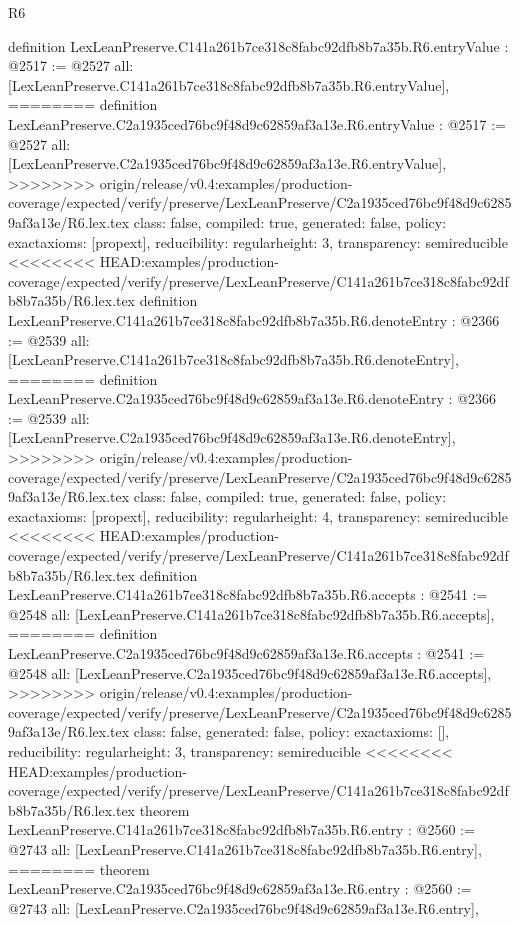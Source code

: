 \begin{lexlean}{R6}
\begin{coremodule}
{{{{{{{{{{{{{{definition LexLeanPreserve.C141a261b7ce318c8fabc92dfb8b7a35b.R6.entryValue : @2517 := @2527 {
  all: [LexLeanPreserve.C141a261b7ce318c8fabc92dfb8b7a35b.R6.entryValue],
========
definition LexLeanPreserve.C2a1935ced76bc9f48d9c62859af3a13e.R6.entryValue : @2517 := @2527 {
  all: [LexLeanPreserve.C2a1935ced76bc9f48d9c62859af3a13e.R6.entryValue],
>>>>>>>> origin/release/v0.4:examples/production-coverage/expected/verify/preserve/LexLeanPreserve/C2a1935ced76bc9f48d9c62859af3a13e/R6.lex.tex
  class: false,
  compiled: true,
  generated: false,
  policy: exact{axioms: [propext]},
  reducibility: regular{height: 3},
  transparency: semireducible
}
<<<<<<<< HEAD:examples/production-coverage/expected/verify/preserve/LexLeanPreserve/C141a261b7ce318c8fabc92dfb8b7a35b/R6.lex.tex
definition LexLeanPreserve.C141a261b7ce318c8fabc92dfb8b7a35b.R6.denoteEntry : @2366 := @2539 {
  all: [LexLeanPreserve.C141a261b7ce318c8fabc92dfb8b7a35b.R6.denoteEntry],
========
definition LexLeanPreserve.C2a1935ced76bc9f48d9c62859af3a13e.R6.denoteEntry : @2366 := @2539 {
  all: [LexLeanPreserve.C2a1935ced76bc9f48d9c62859af3a13e.R6.denoteEntry],
>>>>>>>> origin/release/v0.4:examples/production-coverage/expected/verify/preserve/LexLeanPreserve/C2a1935ced76bc9f48d9c62859af3a13e/R6.lex.tex
  class: false,
  compiled: true,
  generated: false,
  policy: exact{axioms: [propext]},
  reducibility: regular{height: 4},
  transparency: semireducible
}
<<<<<<<< HEAD:examples/production-coverage/expected/verify/preserve/LexLeanPreserve/C141a261b7ce318c8fabc92dfb8b7a35b/R6.lex.tex
definition LexLeanPreserve.C141a261b7ce318c8fabc92dfb8b7a35b.R6.accepts : @2541 := @2548 {
  all: [LexLeanPreserve.C141a261b7ce318c8fabc92dfb8b7a35b.R6.accepts],
========
definition LexLeanPreserve.C2a1935ced76bc9f48d9c62859af3a13e.R6.accepts : @2541 := @2548 {
  all: [LexLeanPreserve.C2a1935ced76bc9f48d9c62859af3a13e.R6.accepts],
>>>>>>>> origin/release/v0.4:examples/production-coverage/expected/verify/preserve/LexLeanPreserve/C2a1935ced76bc9f48d9c62859af3a13e/R6.lex.tex
  class: false,
  generated: false,
  policy: exact{axioms: []},
  reducibility: regular{height: 3},
  transparency: semireducible
}
<<<<<<<< HEAD:examples/production-coverage/expected/verify/preserve/LexLeanPreserve/C141a261b7ce318c8fabc92dfb8b7a35b/R6.lex.tex
theorem LexLeanPreserve.C141a261b7ce318c8fabc92dfb8b7a35b.R6.entry : @2560 := @2743 {
  all: [LexLeanPreserve.C141a261b7ce318c8fabc92dfb8b7a35b.R6.entry],
========
theorem LexLeanPreserve.C2a1935ced76bc9f48d9c62859af3a13e.R6.entry : @2560 := @2743 {
  all: [LexLeanPreserve.C2a1935ced76bc9f48d9c62859af3a13e.R6.entry],
}}}}}}}}}}}}}}}}}}}
\end{coremodule}
\end{lexlean}
